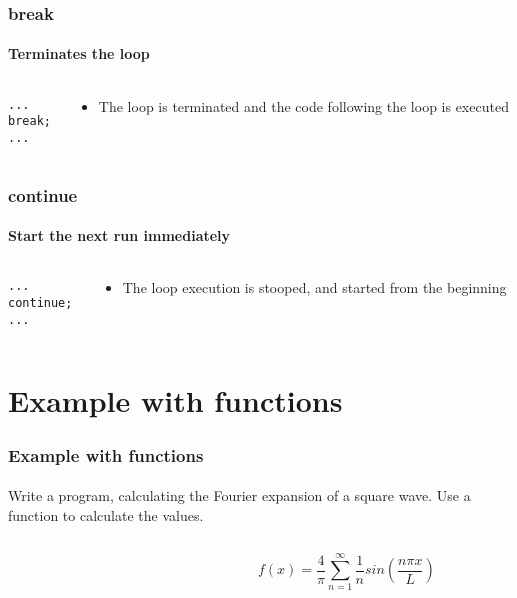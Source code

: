 \documentclass[10pt]{beamer}
\begin{document}
\begin{frame}[fragile]
  \frametitle{break}
  \framesubtitle{Terminates the loop}
  \begin{columns}
    \begin{column}{0.6\textwidth}
\begin{lstlisting}
...
break;
...
\end{lstlisting}
    \end{column}
    \begin{column}{0.5\textwidth}
    \begin{itemize}
      \item The loop is terminated and the code following the loop is executed
    \end{itemize}
    \end{column}
  \end{columns}
\end{frame}

\begin{frame}[fragile]
  \frametitle{continue}
  \framesubtitle{Start the next run immediately}
  \begin{columns}
    \begin{column}{0.6\textwidth}
\begin{lstlisting}
...
continue;
...
\end{lstlisting}
    \end{column}
    \begin{column}{0.5\textwidth}
    \begin{itemize}
      \item The loop execution is stooped, and started from the beginning
    \end{itemize}
    \end{column}
  \end{columns}
\end{frame}

\section{Example with functions}

\begin{frame}[fragile]
  \frametitle{Example with functions}
  \framesubtitle{}
  Write a program, calculating the Fourier expansion of a square wave. Use a function to calculate the values.
    \begin{columns}
    \begin{column}{0.6\textwidth}
    \end{column}
    \begin{column}{0.5\textwidth}
    \begin{equation}
      f(x)=\frac{4}{\pi} \sum_{n=1}^{\infty}\frac{1}{n}sin(\frac{n\pi x}{L})
    \end{equation}
    \end{column}
  \end{columns}

  
\end{frame}
\end{document}
